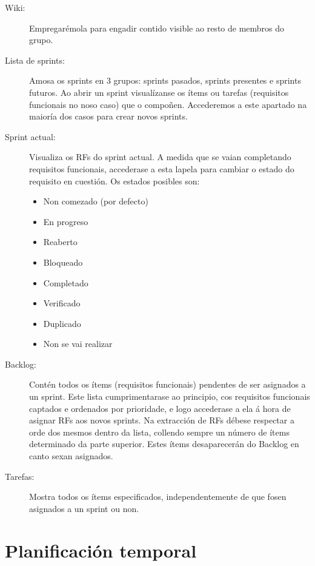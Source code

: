 \begin{description}
\item[Wiki:] Empregarémola para engadir contido visible ao resto de membros do grupo.
\item[Lista de sprints:] Amosa os sprints en 3 grupos: sprints pasados, sprints presentes e sprints futuros. Ao abrir un sprint visualízanse os ítems ou tarefas (requisitos funcionais no noso caso) que o compoñen. Accederemos a este apartado na maioría dos casos para crear novos sprints.
\item[Sprint actual:] Visualiza os RFs do sprint actual. A medida que se vaian completando requisitos funcionais, accederase a esta lapela para cambiar o estado do requisito en cuestión. Os estados posibles son:
\begin{itemize}
\item Non comezado (por defecto)
\item En progreso
\item Reaberto
\item Bloqueado
\item Completado
\item Verificado
\item Duplicado
\item Non se vai realizar
\end{itemize}
\item[Backlog:] Contén todos os ítems (requisitos funcionais) pendentes de ser asignados a un sprint. Este lista cumprimentarase ao principio, cos requisitos funcionais captados e ordenados por prioridade, e logo accederase a ela á hora de asignar RFs aos novos sprints. Na extracción de RFs débese respectar a orde dos mesmos dentro da lista, collendo sempre un número de ítems determinado da parte superior. Estes ítems desaparecerán do Backlog en canto sexan asignados.
\item[Tarefas:] Mostra todos os ítems especificados, independentemente de que fosen asignados a un sprint ou non.
\end{description} 

\section{Planificación temporal}

